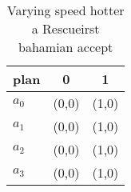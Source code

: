 \documentclass[a4paper]{article}
\begin{document}
\begin{table}
\begin{adjustbox}{width=0.8\columnwidth}
\begin{tabular}{|l|l|l|}
\hline
\textbf{plan} & \multicolumn{1}{c|}{\textbf{0}} & \multicolumn{1}{c|}{\textbf{1}} \\ \hline
\textbf{$a_0$}  & (0,0) & (1,0) \\ \hline
\textbf{$a_1$}  & (0,0) & (1,0) \\ \hline
\textbf{$a_2$}  & (0,0) & (1,0) \\ \hline
\textbf{$a_3$}  & (0,0) & (1,0) \\ \hline
\end{tabular}
\end{adjustbox}
\caption{Varying speed hotter a Rescueirst bahamian accept
}
\end{table}
\end{document}
